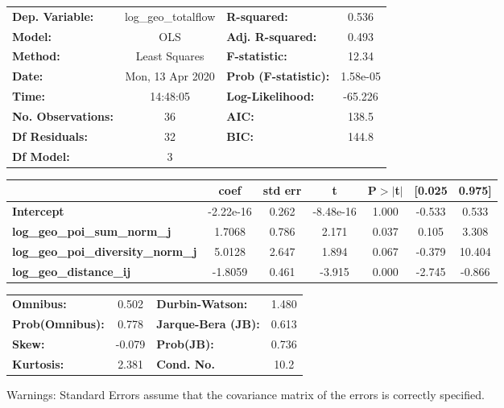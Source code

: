 \begin{center}
\begin{tabular}{lclc}
\toprule
\textbf{Dep. Variable:}                    & log\_geo\_totalflow & \textbf{  R-squared:         } &     0.536   \\
\textbf{Model:}                            &         OLS         & \textbf{  Adj. R-squared:    } &     0.493   \\
\textbf{Method:}                           &    Least Squares    & \textbf{  F-statistic:       } &     12.34   \\
\textbf{Date:}                             &   Mon, 13 Apr 2020  & \textbf{  Prob (F-statistic):} &  1.58e-05   \\
\textbf{Time:}                             &       14:48:05      & \textbf{  Log-Likelihood:    } &   -65.226   \\
\textbf{No. Observations:}                 &            36       & \textbf{  AIC:               } &     138.5   \\
\textbf{Df Residuals:}                     &            32       & \textbf{  BIC:               } &     144.8   \\
\textbf{Df Model:}                         &             3       & \textbf{                     } &             \\
\bottomrule
\end{tabular}
\begin{tabular}{lcccccc}
                                           & \textbf{coef} & \textbf{std err} & \textbf{t} & \textbf{P$> |$t$|$} & \textbf{[0.025} & \textbf{0.975]}  \\
\midrule
\textbf{Intercept}                         &    -2.22e-16  &        0.262     & -8.48e-16  &         1.000        &       -0.533    &        0.533     \\
\textbf{log\_geo\_poi\_sum\_norm\_j}       &       1.7068  &        0.786     &     2.171  &         0.037        &        0.105    &        3.308     \\
\textbf{log\_geo\_poi\_diversity\_norm\_j} &       5.0128  &        2.647     &     1.894  &         0.067        &       -0.379    &       10.404     \\
\textbf{log\_geo\_distance\_ij}            &      -1.8059  &        0.461     &    -3.915  &         0.000        &       -2.745    &       -0.866     \\
\bottomrule
\end{tabular}
\begin{tabular}{lclc}
\textbf{Omnibus:}       &  0.502 & \textbf{  Durbin-Watson:     } &    1.480  \\
\textbf{Prob(Omnibus):} &  0.778 & \textbf{  Jarque-Bera (JB):  } &    0.613  \\
\textbf{Skew:}          & -0.079 & \textbf{  Prob(JB):          } &    0.736  \\
\textbf{Kurtosis:}      &  2.381 & \textbf{  Cond. No.          } &     10.2  \\
\bottomrule
\end{tabular}
\end{center}

Warnings: \newline
 [1] Standard Errors assume that the covariance matrix of the errors is correctly specified.